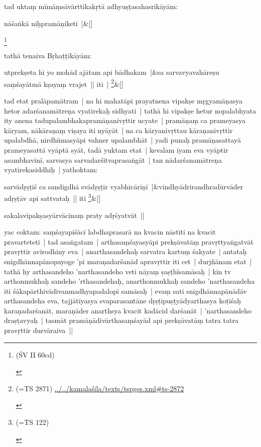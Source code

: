 \documentclass[article,12pt,a4paper]{memoir}
\begin{document}
	  \pstart tad uktaṃ mīmāṃsāvārttikakṛ\leavevmode{}tā adhyuṣṭasahasrikāyām: 
	    \pend
	  
	    
	    \stanza[\smallbreak]
	nāśaṅkā niḥpramāṇiketi |\&[\smallbreak]


	
	    \pstart
	  \footnote{\begin{english}(ŚV II 60cd)\end{english}}
	\pend
      

	  \pstart tathā tenaiva Bṛhaṭṭīkāyām:
	\pend
      
	    
	    \stanza[\smallbreak]
	utprekṣeta hi yo mohād ajātam api bādhakam |&sa sarvavyavahāreṣu saṃśayātmā kṣayaṃ vrajet || iti | \footnote{\begin{english}(=TS 2871) \href{../../kamalaśīla/texts/tsp_ges.xml\#ts-2872}{../../kamalaśīla/texts/tsp\textunderscore ges.xml\#ts-2872}\end{english}}\&[\smallbreak]


	

	  \pstart tad etat pralāpamātram | na hi mahatāpi prayatnena vipakṣe mṛgyamāṇasya hetor adarśanamātreṇa vyatirekaḥ sidhyati | tathā hi vipakṣe hetur nopalabhyata ity anena tadupalambhakapramāṇanivṛttir ucyate |  pramāṇaṃ ca prameyasya kāryam, nākāraṇaṃ viṣaya iti nyāyāt | na ca kāryanivṛttau kāraṇanivṛttir upalabdhā, nirdhūmasyāpi vahner upalambhāt | yadi punaḥ pramāṇasattayā prameyasattā vyāptā syāt, tadā yuktam etat | kevalam iyam eva vyāptir asambhavinī, sarvasya sarvadarśitvaprasaṅgāt | tan nādarśanamātreṇa vyatirekasiddhiḥ | yathoktam: 
	    \pend
	  
	    
	    \stanza[\smallbreak]
	sarvādṛṣṭiś ca sandigdhā svādṛṣṭir vyabhicāriṇī |&vindhyādrirandhradūrvāder adṛṣṭāv api sattvataḥ || iti \footnote{\begin{english}(=TS 122)\end{english}}\&[\smallbreak]


	
	    \pstart
	   sakalavipakṣasyārvācīnaṃ praty adṛśyatvāt ||
	\pend
      

	  \pstart yac coktam: saṃśayapiśācī labdhaprasarā na kvacin nāstīti na kvacit pravarteteti | tad asaṅgatam | arthasaṃśayasyāpi prekṣāvatāṃ pravṛttyaṅgatvāt pravṛttir avirodhiny eva | anarthasandehaḥ sarvatra kartuṃ śakyate | antataḥ snigdhānnapānopayoge 'pi maraṇadarśanād apravṛttir iti cet | durjñānam etat | tathā hy arthasandeho 'narthasandeho veti nāyaṃ ṣaṣṭhīsamāsaḥ | kin tv arthonmukhaḥ sandeho 'rthasandehaḥ, anarthonmukhaḥ sandeho 'narthasandeha iti śākapārthivādivanmadhyapadalopī samāsaḥ | evaṃ sati snigdhānnapānādāv arthasandeha eva, tajjātīyasya svaparasantāne dṛṣṭipuṣṭyādyarthasya koṭiśaḥ karaṇadarśanāt, maraṇāder anarthsya kvacit kadācid darśanāt |  'narthasandeho draṣṭavyaḥ | tasmāt pramāṇādivārthasaṃśayād api prekṣāvatāṃ tatra tatra pravṛttir durvāraiva ||
	\pend
      
\end{document}
